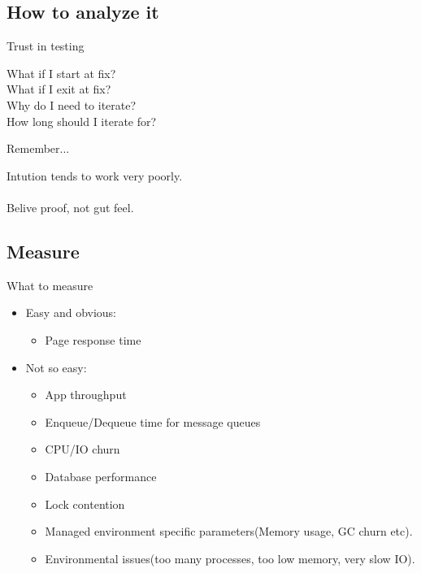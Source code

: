 \documentclass{beamer}
\begin{document}
\subsection{How to analyze it}

\begin{frame}{Trust in testing}
  \begin{center}
  \end{center}
  \begin{center}
    What if I start at fix? \quad\\
    \pause
    What if I exit at fix? \quad\\
    \pause
    Why do I need to iterate? \quad\\
    \pause
    How long should I iterate for? \quad\\
  \end{center}
\end{frame}

\begin{frame}{Remember...}
  \begin{center}
    \large{Intution tends to work very poorly.}\quad\\
    \quad\\
    \small{Belive proof, not gut feel.}
  \end{center}
\end{frame}

\subsection{Measure}

\begin{frame}{What to measure}
  \begin{itemize}
  \item Easy and obvious: 
    \begin{itemize}
    \item Page response time
    \end{itemize}
    \pause
  \item Not so easy:
    \begin{itemize}
      \item App throughput
      \item Enqueue/Dequeue time for message queues
      \item CPU/IO churn
      \item Database performance
      \item Lock contention
      \item Managed environment specific parameters(Memory usage, GC churn etc).
      \item Environmental issues(too many processes, too low memory, very slow IO).
    \end{itemize}
  \end{itemize}
\end{frame}
\end{document}
